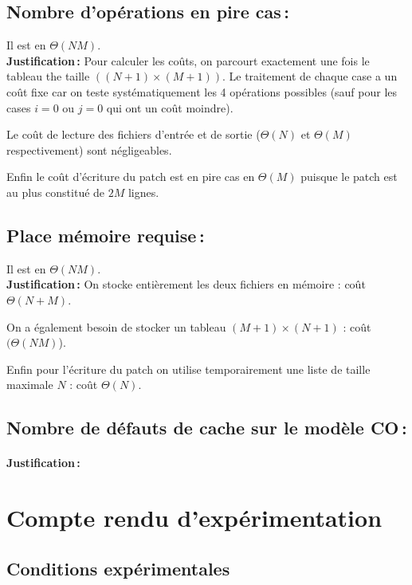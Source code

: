 \documentclass[a4paper, 10pt, french]{article}
\begin{document}
  \subsection{Nombre  d'opérations en pire cas\,: }
    Il est en $\Theta(NM)$.\\

    \textbf{Justification\,:} Pour calculer les coûts, on parcourt exactement une fois le tableau the taille $((N+1)\times(M+1))$.
    Le traitement de chaque case a un coût fixe car on teste systématiquement les 4 opérations possibles (sauf pour les cases $i=0$ ou $j=0$ qui ont un coût moindre).

    Le coût de lecture des fichiers d'entrée et de sortie ($\Theta(N)$ et $\Theta(M)$ respectivement) sont négligeables.

    Enfin le coût d'écriture du patch est en pire cas en $\Theta(M)$ puisque le patch est au plus constitué de $2M$ lignes.

  \subsection{Place mémoire requise\,: }
    Il est en $\Theta(NM)$.\\

    \textbf{Justification\,:} On stocke entièrement les deux fichiers en mémoire : coût $\Theta(N+M)$.

    On a également besoin de stocker un tableau $(M+1)\times(N+1)$ : coût $(\Theta(NM)$).

    Enfin pour l'écriture du patch on utilise temporairement une liste de taille maximale $N$ : coût $\Theta(N)$.

  \subsection{Nombre de défauts de cache sur le modèle CO\,: }
    \paragraph{Justification\,: }


\section{Compte rendu d'expérimentation}
  \subsection{Conditions expérimentales}
\end{document}
